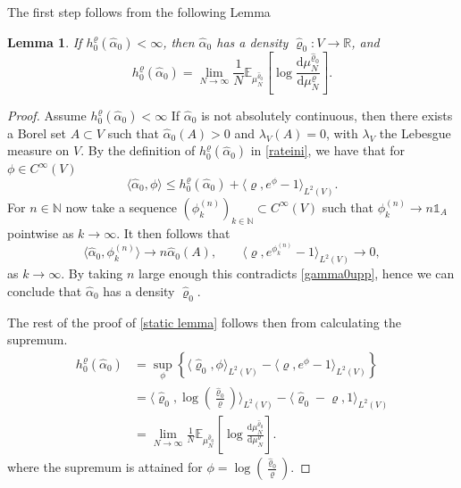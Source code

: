 \documentclass[11pt]{article}
\numberwithin{equation}{section}
\theoremstyle{definition}
\theoremstyle{plain}
\newtheorem{Lemma}[Theorem]{Lemma}
\newcommand{\E}{\mathbb{E}}
\newcommand{\dd}{\mathrm{d}}
\newcommand{\nn}{\nonumber}
\begin{document}
The first step follows from the following Lemma
\begin{Lemma}\label{initial ldp good}
    If $h_0^{\varrho}(\widehat{\alpha}_0)<\infty$, then $\widehat{\alpha}_0$ has a density $\widehat{\varrho}_0:V\to\mathbb{R}$, and 
        \begin{equation}\label{static lemma}
            h_0^{\varrho}(\widehat{\alpha}_0) = \lim_{N\to\infty} \frac{1}{N}\E_{\mu^{\widehat{\varrho}_0}_N}\left[\log\frac{\dd \mu^{\widehat{\varrho}_0}_N}{\dd \mu^{\varrho}_N}\right].
        \end{equation}
\end{Lemma}
\begin{proof}
    Assume $h_0^{\varrho}(\widehat{\alpha}_0)<\infty$ If $\widehat{\alpha}_0$ is not absolutely continuous, then there exists a Borel set $A \subset V$ such that $\widehat{\alpha}_0(A) > 0$ and $\lambda_V(A)=0$, with $\lambda_V$ the Lebesgue measure on $V$. By the definition of $h_0^\varrho(\widehat{\alpha}_0)$ in \eqref{rateini}, we have that for $\phi \in C^\infty(V)$
        \begin{equation}\label{gamma0upp}
             \langle \widehat{\alpha}_0, \phi \rangle \leq h_0^\varrho(\widehat{\alpha}_0) + \langle \varrho, e^\phi -1 \rangle_{L^2(V)}.
        \end{equation}
    For $n\in\mathbb{N}$ now take a sequence $(\phi^{(n)}_k)_{k\in\mathbb{N}} \subset C^\infty(V)$ such that $\phi^{(n)}_k \to n\mathds{1}_A$ pointwise as $k\to\infty$. It then follows that
        \begin{equation}
            \langle \widehat{\alpha}_0, \phi^{(n)}_k \rangle\to n\widehat{\alpha}_0(A), \qquad \langle \varrho, e^{\phi^{(n)}_k} -1 \rangle_{L^2(V)} \to 0,
        \end{equation} 
    as $k\to\infty$. By taking $n$ large enough this contradicts \eqref{gamma0upp},
    hence we can conclude that  $\widehat{\alpha}_0$ has a density $\widehat{\varrho}_0$.

    The rest of the proof of \eqref{static lemma} follows then from calculating the supremum.
    \begin{align}
        \nn h^{\varrho}_0(\widehat{\alpha}_0) 
        &= \sup_\phi \left\{\langle \widehat{\varrho}_0, \phi\rangle_{L^2(V)} - \langle \varrho, e^\phi -1 \rangle_{L^2(V)}\right\}\\
        \nn&= \langle \widehat{\varrho}_0, \log(\tfrac{\widehat{\varrho}_0}{\varrho})\rangle_{L^2(V)} - \langle \widehat{\varrho}_0 - \varrho, 1\rangle_{L^2(V)}\\
        &= \lim_{N\to\infty} \frac{1}{N}\E_{\mu^{\widehat{\varrho}_0}_N}\left[\log\frac{\dd \mu^{\widehat{\varrho}_0}_N}{ \dd \mu^{\varrho}_N}\right].
    \end{align}
    where the supremum is attained for $\phi = \log(\frac{\widehat{\varrho}_0}{\varrho})$.
\end{proof}
\end{document}

